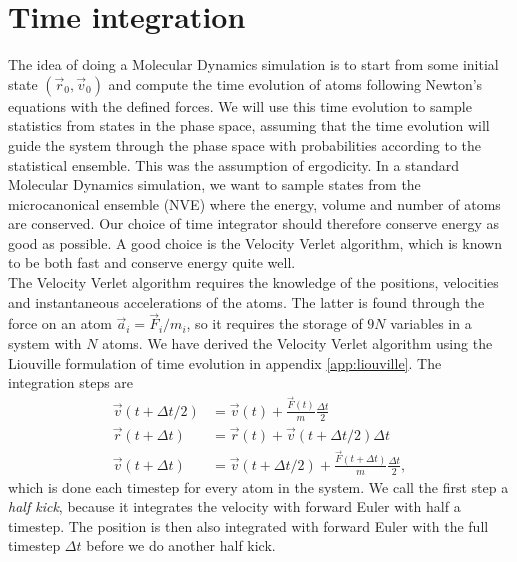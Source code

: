 \section{Time integration}
\label{sec:md_time_integration}
The idea of doing a Molecular Dynamics simulation is to start from some initial state $(\vec r_0, \vec v_0)$ and compute the time evolution of atoms following Newton's equations with the defined forces. We will use this time evolution to sample statistics from states in the phase space, assuming that the time evolution will guide the system through the phase space with probabilities according to the statistical ensemble. This was the assumption of ergodicity. In a standard Molecular Dynamics simulation, we want to sample states from the microcanonical ensemble (NVE) where the energy, volume and number of atoms are conserved. Our choice of time integrator should therefore conserve energy as good as possible. A good choice is the Velocity Verlet algorithm, which is known to be both fast and conserve energy quite well\cite{frenkel2001understanding}.\\
The Velocity Verlet algorithm requires the knowledge of the positions, velocities and instantaneous accelerations of the atoms. The latter is found through the force on an atom $\vec a_i = \vec F_i/m_i$, so it requires the storage of $9N$ variables in a system with $N$ atoms. We have derived the Velocity Verlet algorithm using the Liouville formulation of time evolution in appendix \ref{app:liouville}. The integration steps are
\begin{align}
	\vec v(t + \Delta t/2) &= \vec v(t) + \frac{\vec F(t)}{m}\frac{\Delta t}{2}\\
	\vec r(t + \Delta t) &= \vec r(t) + \vec v(t + \Delta t/2)\Delta t\\
	\vec v(t + \Delta t) &= \vec v(t + \Delta t/2) + \frac{\vec F(t + \Delta t)}{m}\frac{\Delta t}{2},
\end{align}
which is done each timestep for every atom in the system. We call the first step a \textit{half kick}, because it integrates the velocity with forward Euler with half a timestep. The position is then also integrated with forward Euler with the full timestep $\Delta t$ before we do another half kick.